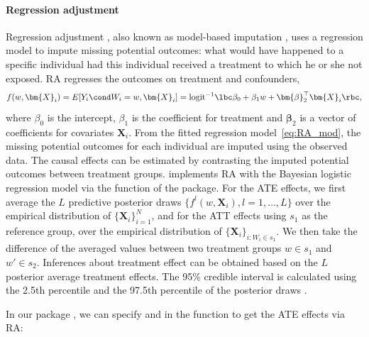 \paragraph{Regression adjustment} 
Regression adjustment \citep{rubin1973use,  linden2016estimating}, also known as model-based imputation \citep{imbens2015causal},  uses a regression model to impute missing potential outcomes: what would have happened to a specific individual had this individual received a treatment to which he or she not exposed. RA regresses the outcomes on treatment and confounders, 
\begin{equation} \label{eq:RA_mod}
f(w,\bm{X}_i) = E[Y_i \cond  W_i =w, \bm{X}_i] = \text{logit}^{-1} \lbc \beta_0 + \beta_1 w + \bm{\beta}_2^{\top}\bm{X}_i\rbc,
\end{equation} 
where $\beta_0$ is the intercept, $\beta_1$ is the coefficient for treatment and $\bm{\beta}_2$ is a vector of coefficients for covariates $\bm{X}_i$. 
From the fitted regression model~\eqref{eq:RA_mod}, the missing potential outcomes for each individual are imputed using the observed data. The causal effects can be estimated by contrasting the imputed potential outcomes between treatment groups.   implements RA with the Bayesian logistic regression model via the  function of the  package. For the ATE effects, we first average the $L$ predictive posterior draws $\{f^l(w,\bm{X}_i), l =1,\ldots, L\}$ over the empirical distribution of $\{\bm{X}_i\}_{i=1}^N$, and for the ATT effects using $s_1$ as the reference group, over the empirical distribution of $\{\bm{X}_i\}_{i: W_i \in s_1}$. We then take the difference of the averaged values between two treatment groups $w \in s_1$ and $w' \in s_2$. Inferences about treatment effect can be obtained based on the $L$ posterior average treatment effects. The 95\% credible interval is calculated using the 2.5th percentile and the 97.5th percentile of the posterior draws \citep{kruschke2014doing}.

In our package , we can specify  and  in the  function to get the ATE effects via RA:

\begin{Schunk}
\end{Schunk}

